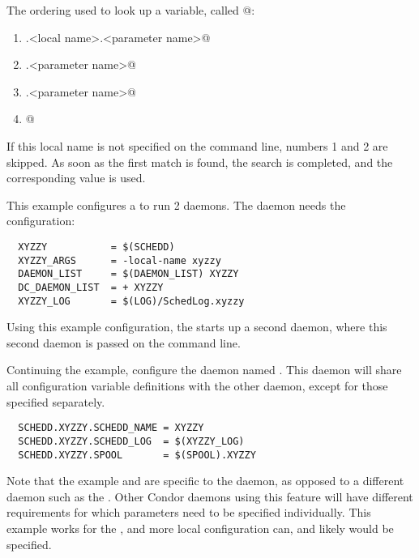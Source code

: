 The ordering used to look up a variable, called @:

\begin{enumerate}
\item {}.<local name>.<parameter name>@

\item {}.<parameter name>@

\item {}.<parameter name>@

\item {}@
\end{enumerate}

If this local name is not specified on the command line, 
numbers 1 and 2 are skipped.
As soon as the first match is found, the search is completed,
and the corresponding value is used.

This example configures a  to run 2 
daemons.  The  daemon needs the configuration:
\begin{verbatim}
  XYZZY           = $(SCHEDD)
  XYZZY_ARGS      = -local-name xyzzy
  DAEMON_LIST     = $(DAEMON_LIST) XYZZY
  DC_DAEMON_LIST  = + XYZZY
  XYZZY_LOG       = $(LOG)/SchedLog.xyzzy
\end{verbatim}

Using this example configuration, the  starts up a
second  daemon, 
where this second  daemon is passed 
on the command line.

Continuing the example,
configure the  daemon named .
This  daemon will share all configuration variable
definitions with the other  daemon,
except for those specified separately.

\begin{verbatim}
  SCHEDD.XYZZY.SCHEDD_NAME = XYZZY
  SCHEDD.XYZZY.SCHEDD_LOG  = $(XYZZY_LOG)
  SCHEDD.XYZZY.SPOOL       = $(SPOOL).XYZZY
\end{verbatim}

Note that the example  and  are
specific to the  daemon, as opposed to a different daemon
such as the .
Other Condor daemons using this feature will
have different requirements for which parameters need to be
specified individually.  This example works for the ,
and more local configuration can, and likely would be specified.

